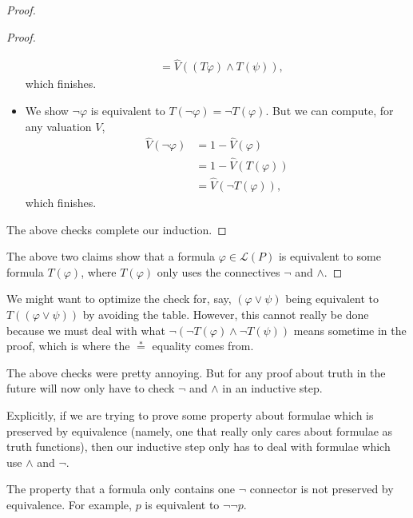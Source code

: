\begin{proof}
\begin{proof}
\begin{itemize}
\begin{align*}
				&= \hat V((T\varphi)\land T(\psi)),
			\end{align*}
			which finishes.
			\item We show $\lnot\varphi$ is equivalent to $T(\lnot\varphi)=\lnot T(\varphi)$. But we can compute, for any valuation $V$,
			\begin{align*}
				\hat V(\lnot\varphi) &= 1-\hat V(\varphi) \\
				&= 1-\hat V(T(\varphi)) \\
				&= \hat V(\lnot T(\varphi)),
			\end{align*}
			which finishes.
		\end{itemize}
		The above checks complete our induction.
	\end{proof}
	The above two claims show that a formula $\varphi\in\mathcal L(P)$ is equivalent to some formula $T(\varphi)$, where $T(\varphi)$ only uses the connectives $\lnot$ and $\land$.
\end{proof}
\begin{remark}
	We might want to optimize the check for, say, $(\varphi\lor\psi)$ being equivalent to $T((\varphi\lor\psi))$ by avoiding the table. However, this cannot really be done because we must deal with what $\lnot(\lnot T(\varphi)\land\lnot T(\psi))$ means sometime in the proof, which is where the $\stackrel*=$ equality comes from.
\end{remark}
\begin{remark}
	The above checks were pretty annoying. But for any proof about truth in the future will now only have to check $\lnot$ and $\land$ in an inductive step.
\end{remark}
Explicitly, if we are trying to prove some property about formulae which is preserved by equivalence (namely, one that really only cares about formulae as truth functions), then our inductive step only has to deal with formulae which use $\land$ and $\lnot$.
\begin{nex}
	The property that a formula only contains one $\lnot$ connector is not preserved by equivalence. For example, $p$ is equivalent to $\lnot\lnot p$.
\end{nex}

